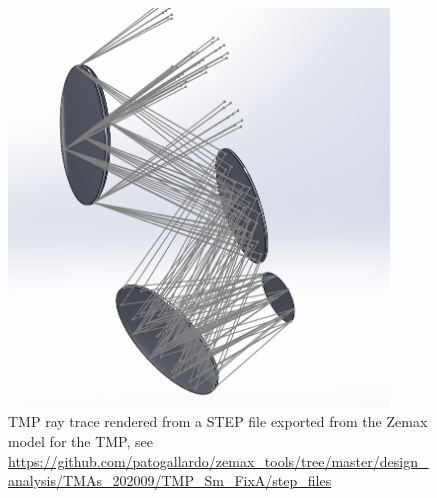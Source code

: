 \documentclass[12pt, letterpaper, twoside]{article}
\begin{document}
\begin{figure}
	\centering
	\includegraphics[width=0.9\textwidth]{mirror_fp_rays.PNG}
	\caption{TMP ray trace rendered from a STEP file exported from the Zemax model for the TMP, see \url{https://github.com/patogallardo/zemax_tools/tree/master/design_analysis/TMAs_202009/TMP_Sm_FixA/step_files}}
\end{figure}
\end{document}

